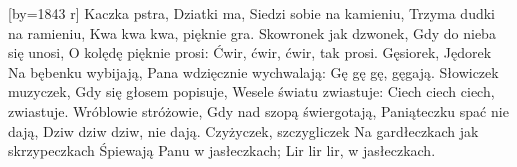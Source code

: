 \endverse
\endsong


[by={1843 r}]
\beginverse
    Kaczka pstra, Dziatki ma,
\endverse
\beginchorus
    Siedzi sobie na kamieniu,
    Trzyma dudki na ramieniu,
    Kwa kwa kwa, pięknie gra.
\endchorus
\beginverse
    Skowronek jak dzwonek,
\endverse
\beginchorus
    Gdy do nieba się unosi,
    O kolędę pięknie prosi:
    Ćwir, ćwir, ćwir, tak prosi.
\endchorus
\beginverse
    Gęsiorek, Jędorek
\endverse
\beginchorus
    Na bębenku wybijają,
    Pana wdzięcznie wychwalają:
    Gę gę gę, gęgają.
\endchorus
\beginverse
    Słowiczek muzyczek,
\endverse
\beginchorus
    Gdy się głosem popisuje,
    Wesele światu zwiastuje:
    Ciech ciech ciech, zwiastuje.
\endchorus
\beginverse
    Wróblowie stróżowie,
\endverse
\beginchorus
    Gdy nad szopą świergotają,
    Paniąteczku spać nie dają,
    Dziw dziw dziw, nie dają.
\endchorus
\beginverse
    Czyżyczek, szczygliczek
\endverse
\beginchorus
    Na gardłeczkach jak skrzypeczkach
    Śpiewają Panu w jasłeczkach;
    Lir lir lir, w jasłeczkach.
\endchorus
\endsong
